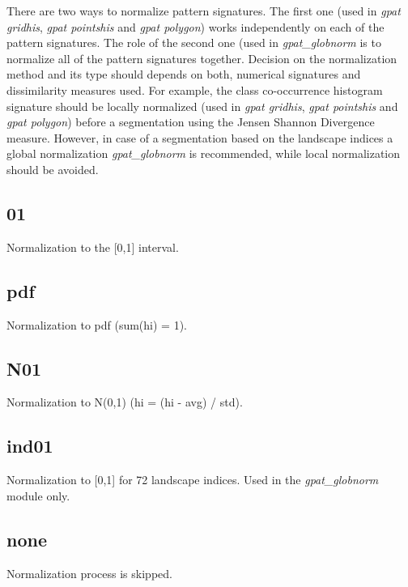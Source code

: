 There are two ways to normalize pattern signatures.
The first one (used in {\it gpat gridhis}, {\it gpat pointshis} and {\it gpat polygon}) works independently on each of the pattern signatures.
The role of the second one (used in {\it gpat_globnorm} is to normalize all of the pattern signatures together. 
Decision on the normalization method and its type should depends on both, numerical signatures and dissimilarity measures used.
For example, the class co-occurrence histogram signature should be locally normalized (used in {\it gpat gridhis}, {\it gpat pointshis} and {\it gpat polygon}) before a segmentation using the Jensen Shannon Divergence measure.
However, in case of a segmentation based on the landscape indices a global normalization {\it gpat_globnorm} is recommended, while local normalization should be avoided.

\subsection{01}

Normalization to the [0,1] interval.

\subsection{pdf}

Normalization to pdf (sum(hi) = 1).

\subsection{N01}

Normalization to N(0,1) (hi = (hi - avg) / std).

\subsection{ind01}

Normalization to [0,1] for 72 landscape indices.
Used in the {\it gpat\_globnorm} module only.

\subsection{none}

Normalization process is skipped. 
